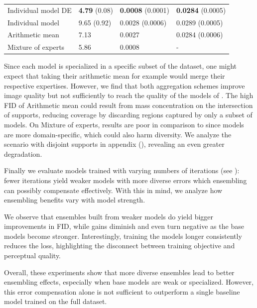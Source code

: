 \documentclass[10pt]{article} %
\begin{document}
\begin{table}[t]
\begin{minipage}{0.48\textwidth}
\begin{tabular}{l G G G}
        Individual model DE & \textbf{4.79} (0.08) & \textbf{0.0008} (0.0001) & \textbf{0.0284} (0.0005) \\
        Individual model & 9.65 (0.92) & 0.0028 (0.0006) & 0.0289 (0.0005) \\
        Arithmetic mean & 7.13 & 0.0027 &  0.0284 (0.0006) \\
        Mixture of experts & 5.86 & 0.0008 & - \\
        \bottomrule
        \end{tabular}
        \label{tab: aggregations intersection}
    \end{minipage}
\end{table}

Since each model is specialized in a specific subset of the dataset, one might expect that taking their arithmetic mean for example would merge their respective expertises. However, we find that both aggregation schemes improve image quality but not sufficiently to reach the quality of the models of . The high FID of Arithmetic mean could result from mass concentration on the intersection of supports, reducing coverage by discarding regions captured by only a subset of models. On Mixture of experts, results are poor in comparison to  since models are more domain-specific, which could also harm diversity. We analyze the scenario with disjoint supports in appendix (), revealing an even greater degradation.




Finally we evaluate models trained with varying numbers of iterations (see ): fewer iterations yield weaker models with more diverse errors which ensembling can possibly compensate effectively. With this in mind, we analyze how ensembling benefits vary with model strength. 






We observe that ensembles built from weaker models do yield bigger improvements in FID, while gains diminish and even turn negative as the base models become stronger. Interestingly, training the models longer consistently reduces the loss, highlighting the disconnect between training objective and perceptual quality. 


Overall, these experiments show that more diverse ensembles lead to better ensembling effects, especially when base models are weak or specialized. However, this error compensation alone is not sufficient to outperform a single baseline model trained on the full dataset.
\end{document}

